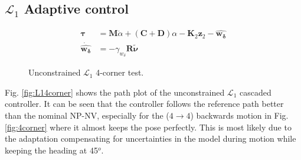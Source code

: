 \subsection{$\mathcal{L}_1$ Adaptive control}

\begin{align}
    \boldsymbol{\tau} &= \boldsymbol{M}\dot{\alpha} + (\boldsymbol{C + D})\alpha - \boldsymbol{K}_2\boldsymbol{z}_2 -\boldsymbol{\hat{w_{\delta}}}  \\
    \boldsymbol{\dot{\hat{w_{\delta}}}} &=-\gamma_{w_\delta}\boldsymbol{R}\tilde{\boldsymbol{\nu}} 
\end{align}






\begin{figure}[!h]
    \centering
    \caption{Unconstrained $\mathcal{L}_1$ 4-corner test. }
\end{figure}\label{fig:L14corner}

Fig. \ref{fig:L14corner} shows the path plot of the unconstrained $\mathcal{L}_1$ cascaded controller. It can be seen that the controller follows the reference path better than the nominal NP-NV, especially for the ($4 \xrightarrow{} 4$) backwards motion in Fig. \ref{fig:4corner} where it almost keeps the pose perfectly. This is most likely due to the adaptation compensating for uncertainties in the model during motion while keeping the heading at 45$^o$.


